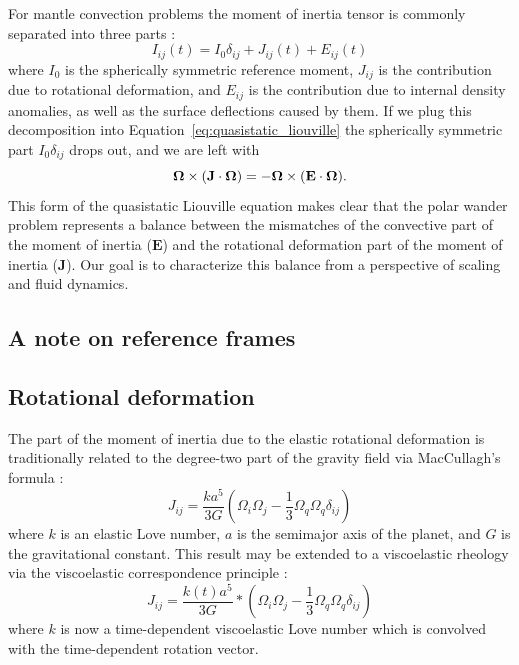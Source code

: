 \documentclass[extra,mreferee]{gji}
\begin{document}
For mantle convection problems the moment of inertia tensor is commonly separated into three parts \citep{sabadini1981pleistocene, spada1992excitation}:
\begin{equation}
I_{ij}(t) = I_0 \delta_{ij} + J_{ij}(t) + E_{ij}(t)
\label{eq:separation}
\end{equation}
where $I_0$ is the spherically symmetric reference moment, $J_{ij}$ is the contribution due to rotational deformation, and $E_{ij}$ is the contribution due to internal density anomalies, as well as the surface deflections caused by them.
If we plug this decomposition into Equation~\eqref{eq:quasistatic_liouville} the spherically symmetric part $I_0 \delta_{ij}$ drops out, and we are left with
\begin{equation}
\mathbf{\Omega} \times (\mathbf{J} \cdot \mitbf{\Omega}) = -\mitbf{\Omega} \times ( \mathbf{E} \cdot \mitbf{\Omega} ).
\label{eq:disequilibrium}
\end{equation}
This form of the quasistatic Liouville equation makes clear that the polar wander problem represents a balance between the mismatches
of the convective part of the moment of inertia ($\mathbf{E}$) and the rotational deformation part of the moment of inertia ($\mathbf{J}$).
Our goal is to characterize this balance from a perspective of scaling and fluid dynamics.

\subsection{A note on reference frames}
\label{sec:reference_frames}



\subsection{Rotational deformation}
\label{sec:rotational_deformation}

The part of the moment of inertia due to the elastic rotational deformation is traditionally related to the degree-two part of the gravity field via MacCullagh's formula \citep{munk1960rotation}:
\begin{equation}
J_{ij} = \frac{k a^5}{3 G} \left( \Omega_i \Omega_j - \frac{1}{3} \Omega_q \Omega_q \delta_{ij} \right)
\label{eq:elastic_deformation}
\end{equation}
where $k$ is an elastic Love number, $a$ is the semimajor axis of the planet, and $G$ is the gravitational constant.
This result may be extended to a viscoelastic rheology via the viscoelastic correspondence principle \citep[e.g.][]{peltier1974impulse}:
\begin{equation}
J_{ij} = \frac{k(t) a^5}{3 G} * \left( \Omega_i \Omega_j - \frac{1}{3} \Omega_q \Omega_q \delta_{ij} \right)
\label{eq:viscoelastic_deformation}
\end{equation}
where $k$ is now a time-dependent viscoelastic Love number which is convolved with the time-dependent rotation vector.
\end{document}
